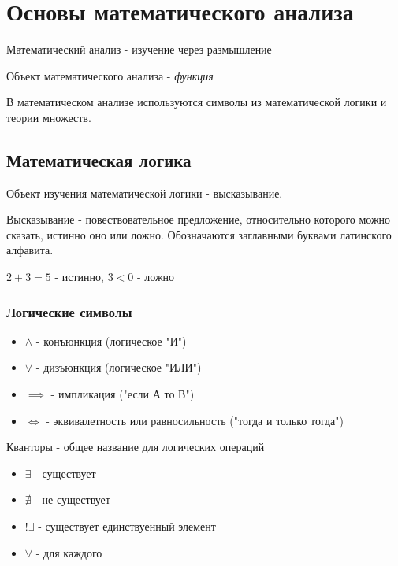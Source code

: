 \section{Основы математического анализа}

Математический анализ - изучение через размышление

Объект математического анализа - \textit{функция}

В математическом анализе используются символы из математической логики и теории множеств.

\subsection{Математическая логика}

Объект изучения математической логики - высказывание.

\begin{definition}
  Высказывание - повествовательное предложение, относительно которого можно сказать, истинно оно или ложно. Обозначаются заглавными буквами латинского алфавита.
\end{definition}
\begin{eg}
  $2+3=5$ - истинно, $3 < 0$ - ложно
\end{eg}

\subsubsection{Логические символы}

\begin{itemize}
  \item $\land$ - конъюнкция (логическое "И")
  \item $\lor$ - дизъюнкция (логическое "ИЛИ")
  \item $\implies$ - импликация ("если А то В")
  \item $\iff$ - эквивалетность или равносильность ("тогда и только тогда")
\end{itemize}

Кванторы - общее название для логических операций

\begin{itemize}
  \item $\exists$ - существует
  \item $\nexists$ - не существует
  \item $!\exists$ - существует единствуенный элемент
  \item $\forall$ - для каждого
\end{itemize}

